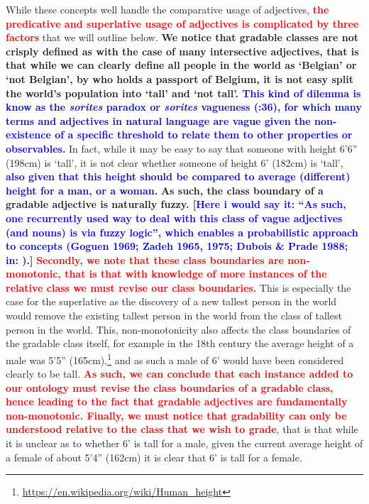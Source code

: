 \documentclass[11pt]{article}
\begin{document}
While these concepts well handle the comparative usage of adjectives, \textbf{\textcolor{red}{the 
predicative and superlative usage of adjectives is complicated by three factors}}
that we will outline below. \textbf{We notice that gradable classes are not 
crisply defined as with the case of many intersective adjectives, that is that 
while we can clearly define all people in the world as `Belgian' or 
`not Belgian', by who holds a passport of Belgium, it is not easy 
split the world's population into `tall' and `not tall'. \textcolor{blue}{This kind of dilemma is know as the \textit{sorites} paradox or \textit{sorites} vagueness (\cite{Bennett06kr}:36), for which many terms and adjectives in natural language are vague given the non-existence of a specific threshold to relate them to other properties or observables.}} In fact, while it may 
be easy to say that someone with height 6'6'' (198cm) is `tall', it is not clear 
whether someone of height 6' (182cm) is `tall', \textbf{\textcolor{blue}{also given that this height should be compared to average (different)
height for a man, or a woman.}} \textbf{As such, the class boundary of a gradable adjective is 
naturally fuzzy. [\textcolor{blue}{Here i would say it: ``As such, one recurrently used way to deal with this class of vague adjectives (and nouns) is via fuzzy logic'', which enables a probabilistic approach to concepts (Goguen 1969; Zadeh 1965, 1975; Dubois \& Prade 1988; in: \cite{Bennett06kr}).}]} \textbf{\textcolor{red}{Secondly, we note that these class boundaries are 
non-monotonic, that is that with knowledge of more instances of the relative 
class we must revise our class boundaries.}} This is especially the case for the
superlative as the discovery of a new tallest person in the world would remove 
the existing tallest person in the world from the class of tallest person in the 
world. This, non-monotonicity also affects the class boundaries of the gradable 
class itself, for example in the 18th century the average height of a male was 
5'5'' (165cm).\footnote{\url{https://en.wikipedia.org/wiki/Human_height}}
and as such a male of 6' would have been considered clearly to be 
tall. \textbf{\textcolor{red}{As such, we can conclude that each instance added to our ontology must 
revise the class boundaries of a gradable class, hence leading to the fact that 
gradable adjectives are fundamentally non-monotonic. Finally, we must notice 
that gradability can only be understood relative to the class that we wish to 
grade}}, that is that while it is unclear as to whether 6' is tall for a male, 
given the current average height of a female of about 5'4'' (162cm) it is clear 
that 6' is tall for a female.
\end{document}
